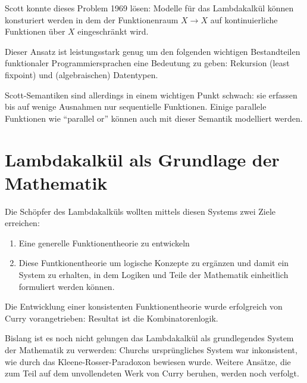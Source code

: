 Scott konnte dieses Problem 1969 lösen:
Modelle für das Lambdakalkül können konsturiert werden in dem 
der Funktionenraum $X → X$ auf kontinuierliche 
Funktionen über $X$ eingeschränkt wird.

Dieser Ansatz ist leistungsstark genug um den folgenden wichtigen
Bestandteilen funktionaler Programmiersprachen eine Bedeutung zu geben:
Rekursion (least fixpoint) und (algebraischen) Datentypen.

Scott-Semantiken sind allerdings in einem wichtigen Punkt schwach:
sie erfassen bis auf wenige Ausnahmen nur sequentielle Funktionen.
Einige parallele Funktionen wie \enquote{parallel or} können 
auch mit dieser Semantik modelliert werden.



\newpage
\section{Lambdakalkül als Grundlage der Mathematik}

Die Schöpfer des Lambdakalküls  wollten mittels 
diesen Systems zwei Ziele erreichen:
\begin{enumerate}
\item \label{funtheory} Eine generelle Funktionentheorie zu entwickeln
\item \label{exfuntheory} Diese Funtkionentheorie um logische Konzepte 
	  zu ergänzen und damit ein System zu erhalten, 
	  in dem Logiken  
	  und Teile der Mathematik einheitlich formuliert werden können.
\end{enumerate}

Die Entwicklung einer konsistenten Funktionentheorie wurde erfolgreich
von Curry vorangetrieben: Resultat ist die Kombinatorenlogik. 

Bislang ist es noch nicht gelungen das Lambdakalkül als grundlegendes
System der Mathematik zu verwerden:
Churchs ursprüngliches System war inkonsistent, wie durch das 
Kleene-Rosser-Paradoxon bewiesen wurde. 
Weitere Ansätze, die zum Teil auf dem unvollendeten Werk
von Curry beruhen, werden noch verfolgt.

